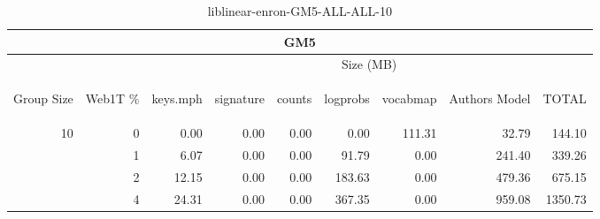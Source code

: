 \begin{center}
\begin{table}[htbp]
\begin{tabular}{ | r | r | r | r | r | r | r | r | r |}
\hline
\multicolumn{9}{|c|}{GM5}\\
\hline
 & & \multicolumn{7}{|c|}{Size (MB)}\\ \cline{3-9}
\begin{sideways}Group Size\end{sideways} & \begin{sideways}Web1T \% \end{sideways} & \begin{sideways}keys.mph\end{sideways} & \begin{sideways}signature\end{sideways} & \begin{sideways}counts\end{sideways} & \begin{sideways}logprobs\end{sideways} & \begin{sideways}vocabmap\end{sideways} & \begin{sideways}Authors Model \end{sideways} & \begin{sideways}TOTAL\end{sideways}\\
\hline
\multirow{3}{*}{10}
 & 0 & 0.00 & 0.00 & 0.00 & 0.00 & 111.31 & 32.79 & 144.10\\ \cline{2-9}
 & 1 & 6.07 & 0.00 & 0.00 & 91.79 & 0.00 & 241.40 & 339.26\\ \cline{2-9}
 & 2 & 12.15 & 0.00 & 0.00 & 183.63 & 0.00 & 479.36 & 675.15\\ \cline{2-9}
 & 4 & 24.31 & 0.00 & 0.00 & 367.35 & 0.00 & 959.08 & 1350.73\\ \cline{2-9}
\hline
\end{tabular}
\caption{liblinear-enron-GM5-ALL-ALL-10}
\label{table:liblinear-enron-GM5-ALL-ALL-10}
\end{table}
\end{center}

